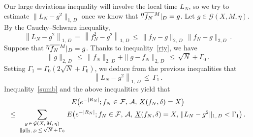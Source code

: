 \documentclass[AHL, Unicode, longabstracts, published]{cedram}
\newcommand{\tatop}[2]{\genfrac{}{}{0pt}{1}{#1}{#2}}
\newcommand{\XX}{{\underline{X}}}
\newcommand*\fmne{^{\displaystyle \eta}\overline{f_N\,}^{\lower2pt\hbox{$\scriptstyle M$}}}
\newcommand{\cA}{\mathcal{A}}
\newcommand{\cF}{\mathcal{F}}
\newcommand{\cG}{\mathcal{G}}
\begin{document}
Our large deviations inequality will involve the local time $L_N$, so we try to estimate $\|L_N-g^2\|_{1,\,D}$ once we know that $\fmne|_D=g$. Let $g\in\cG(X,M,\eta)$. By the Cauchy--Schwarz inequality,
\[
\left\|L_N-g^2\right\|_{1,\,D}\,=\,
\left\|f_N^2-g^2\right\|_{1,\,D}\,\leq\, \|f_N-g\|_{2,\,D}\,
\|f_N+g\|_{2,D}\,.
\]
Suppose that $\fmne|_D=g$. Thanks to inequality~\eqref{rty}, we have
\begin{equation}\label{bfg}
\|g\|_{2,\,D}\,\leq\,\|f_N\|_{2,\,D}+ \|g-f_N\|_{2,\,D}\,\leq\,
\sqrt{N}+\Gamma_0\,.
\end{equation}
Setting $\Gamma_1=\Gamma_0(2\sqrt{N}+\Gamma_0)$, we deduce from the previous inequalities that
\begin{equation}\label{cfg}
\left\|L_N-g^2\right\|_{1,\,D}\,\leq\,
\Gamma_1\,.
\end{equation}
Inequality~\eqref{sumb} and the above inequalities yield that
\begin{multline}\label{sumc}
E\big(e^{-|R_N|}; f_N\in\cF,\,\cA,\,\XX(f_N,\delta)=X\big)
\\
\leq\,\sum_{\tatop{g\,\in\,\cG(X,\,M,\,\eta)}{\|g\|_{2,\,D}\,\leq\,\sqrt{N}\,+\,\Gamma_0}} E\big(e^{-|R_N|}; f_N\in\cF,\,\cA,\,\XX(f_N,\delta)=X,
\,\|L_N-g^2\|_{1,\,D}<\Gamma_1
\big)\,.
\end{multline}
\end{document}
